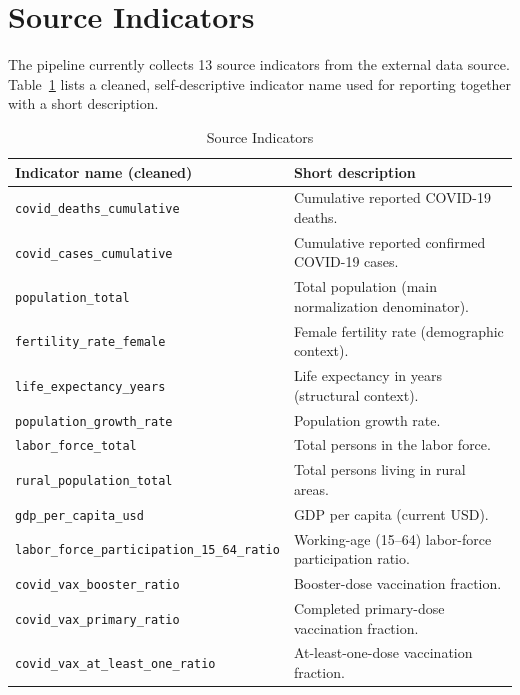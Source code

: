 \documentclass[a4paper]{report}
\begin{document}
\section{Source Indicators}
The pipeline currently collects 13 source indicators from the external data source.
Table~\ref{tab:source-indicator-codes} lists a cleaned, self-descriptive indicator name used for reporting together with a short description.

\begin{table}[h]
    \centering
    \scriptsize
    \caption{Source Indicators}
    \label{tab:source-indicator-codes}
    \begin{tabular}{|p{}|p{}|}
        \hline
        \textbf{Indicator name (cleaned)} & \textbf{Short description} \\
        \hline
        \texttt{covid\_deaths\_cumulative} & Cumulative reported COVID-19 deaths. \\
        \hline
        \texttt{covid\_cases\_cumulative} & Cumulative reported confirmed COVID-19 cases. \\
        \hline
        \texttt{population\_total} & Total population (main normalization denominator). \\
        \hline
        \texttt{fertility\_rate\_female} & Female fertility rate (demographic context). \\
        \hline
        \texttt{life\_expectancy\_years} & Life expectancy in years (structural context). \\
        \hline
        \texttt{population\_growth\_rate} & Population growth rate. \\
        \hline
        \texttt{labor\_force\_total} & Total persons in the labor force. \\
        \hline
        \texttt{rural\_population\_total} & Total persons living in rural areas. \\
        \hline
        \texttt{gdp\_per\_capita\_usd} & GDP per capita (current USD). \\
        \hline
        \texttt{labor\_force\_participation\_15\_64\_ratio} & Working-age (15--64) labor-force participation ratio. \\
        \hline
        \texttt{covid\_vax\_booster\_ratio} & Booster-dose vaccination fraction. \\
        \hline
        \texttt{covid\_vax\_primary\_ratio} & Completed primary-dose vaccination fraction. \\
        \hline
        \texttt{covid\_vax\_at\_least\_one\_ratio} & At-least-one-dose vaccination fraction. \\
        \hline
    \end{tabular}
\end{table}
\end{document}
